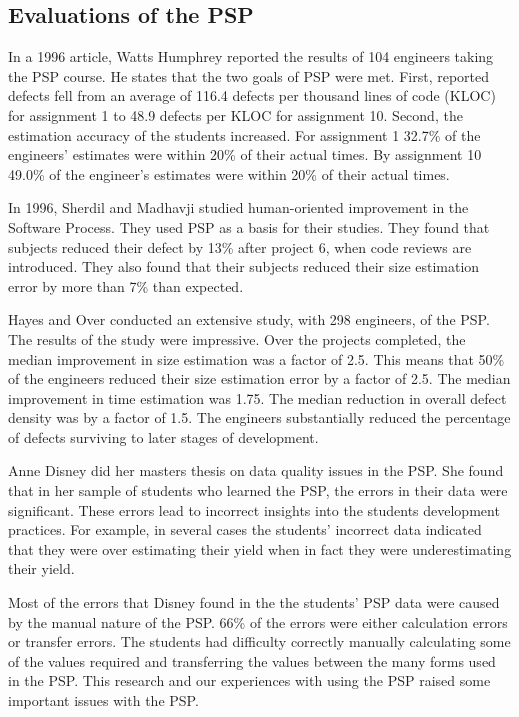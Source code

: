 \subsection{Evaluations of the PSP}

In a 1996 article, Watts Humphrey reported the results of 104 engineers taking
the PSP course\cite{Humphrey96}. He states that the two goals of PSP were met.
First, reported defects fell from an average of 116.4 defects per thousand
lines of code (KLOC) for assignment 1 to 48.9 defects per KLOC for assignment
10. Second, the estimation accuracy of the students increased.  For assignment
1 32.7\% of the engineers' estimates were within 20\% of their actual times. By 
assignment 10 49.0\% of the engineer's estimates were within 20\% of their
actual times.

In 1996, Sherdil and Madhavji studied human-oriented improvement in the
Software Process\cite{Sherdil96}. They used PSP as a basis for their studies.
They found that subjects reduced their defect by 13\% after project 6, when
code reviews are introduced. They also found that their subjects reduced their
size estimation error by more than 7\% than expected.

Hayes and Over conducted an extensive study, with 298 engineers, of the
PSP\cite{Hayes97}.  The results of the study were impressive. Over the projects
completed, the median improvement in size estimation was a factor of 2.5.  This
means that 50\% of the engineers reduced their size estimation error by a
factor of 2.5.  The median improvement in time estimation was 1.75.  The median 
reduction in overall defect density was by a factor of 1.5.  The engineers
substantially reduced the percentage of defects surviving to later stages of
development. 

Anne Disney did her masters thesis on data quality issues in the
PSP\cite{Disney98}.  She found that in her sample of students who learned the
PSP, the errors in their data were significant.  These errors lead to incorrect
insights into the students development practices.  For example, in several
cases the students' incorrect data indicated that they were over estimating
their yield when in fact they were underestimating their yield.

Most of the errors that Disney found in the the students' PSP data were caused
by the manual nature of the PSP.  66\% of the errors were either calculation
errors or transfer errors.  The students had difficulty correctly manually
calculating some of the values required and transferring the values between the
many forms used in the PSP.  This research and our experiences with using the
PSP raised some important issues with the PSP.

